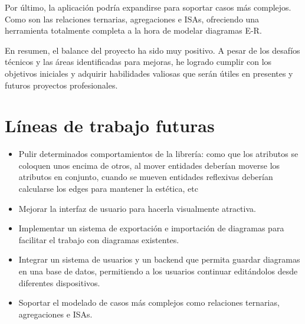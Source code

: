 Por último, la aplicación podría expandirse para soportar casos más complejos. Como son las relaciones ternarias, agregaciones e ISAs, ofreciendo una herramienta totalmente completa a la hora de modelar diagramas E-R.

En resumen, el balance del proyecto ha sido muy positivo. A pesar de los desafíos técnicos y las áreas identificadas para mejoras, he logrado cumplir con los objetivos iniciales y adquirir habilidades valiosas que serán útiles en presentes y futuros proyectos profesionales.

\section{Líneas de trabajo futuras}

\begin{itemize}
    \item Pulir determinados comportamientos de la librería: como que los atributos se coloquen unos encima de otros, al mover entidades deberían moverse los atributos en conjunto, cuando se mueven entidades reflexivas deberían calcularse los edges para mantener la estética, etc
    \item Mejorar la interfaz de usuario para hacerla visualmente atractiva.
    \item Implementar un sistema de exportación e importación de diagramas para facilitar el trabajo con diagramas existentes.
    \item Integrar un sistema de usuarios y un backend que permita guardar diagramas en una base de datos, permitiendo a los usuarios continuar editándolos desde diferentes dispositivos.
    \item Soportar el modelado de casos más complejos como relaciones ternarias, agregaciones e ISAs.
\end{itemize}
